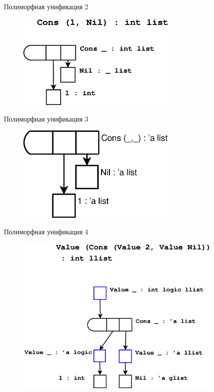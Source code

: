 \documentclass[10pt, mathserif]{beamer}
\theoremstyle{definition}
\begin{document}
\begin{frame}[fragile]{Полиморфная унификация 2}

\begin{figure}
\centering
\includegraphics[width=0.7\textwidth]{img0.eps}
\end{figure}

\end{frame}

\begin{frame}[fragile]{Полиморфная унификация 3}

\begin{figure}
\centering
\includegraphics[width=0.7\textwidth]{img1.eps}
\end{figure}

\end{frame}

\begin{frame}[fragile]{Полиморфная унификация 4}

\begin{figure}
\centering
\includegraphics[width=0.9\textwidth]{img2.eps}
\end{figure}

\end{frame}
\end{document}

